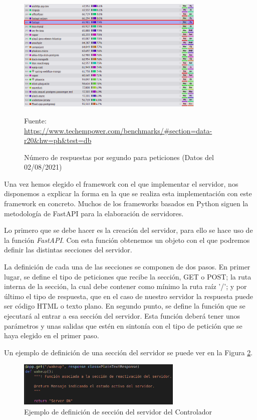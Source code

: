 \begin{figure}[h]
\centering
\includegraphics[width=0.8\textwidth]{imagenes/07_Implementacion/comparativa_fastapi.png}
\begin{center}
Fuente: \url{https://www.techempower.com/benchmarks/#section=data-r20&hw=ph&test=db}
\end{center}
\caption{Número de respuestas por segundo para peticiones (Datos del 02/08/2021)}
\label{fig:comparativa_fastapi}
\end{figure}

Una vez hemos elegido el framework con el que implementar el servidor, nos disponemos a explicar la forma en la que se realiza esta implementación con este framework en concreto. Muchos de los frameworks basados en Python siguen la metodología de FastAPI para la elaboración de servidores.

Lo primero que se debe hacer es la creación del servidor, para ello se hace uso de la función \textit{FastAPI}. Con esta función obtenemos un objeto con el que podremos definir las distintas secciones del servidor.

La definición de cada una de las secciones se componen de dos pasos. En primer lugar, se define el tipo de peticiones que recibe la sección, GET o POST; la ruta interna de la sección, la cual debe contener como mínimo la ruta raíz '/'; y por último el tipo de respuesta, que en el caso de nuestro servidor la respuesta puede ser código HTML o texto plano. En segundo punto, se define la función que se ejecutará al entrar a esa sección del servidor. Esta función deberá tener unos parámetros y unas salidas que estén en sintonía con el tipo de petición que se haya elegido en el primer paso.

Un ejemplo de definición de una sección del servidor se puede ver en la Figura \ref{fig:ejem_def_sec_servidor}.

\begin{figure}[h]
\centering
\includegraphics[width=0.7\textwidth]{imagenes/07_Implementacion/ejem_def_sec_servidor.png}
\caption{Ejemplo de definición de sección del servidor del Controlador}
\label{fig:ejem_def_sec_servidor}
\end{figure}

